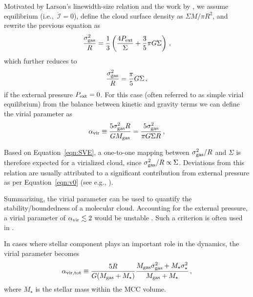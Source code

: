 \IfFileExists{emulateapjlegacy.cls}{\documentclass[iop]{emulateapjlegacy}}{\documentclass[iop]{emulateapj}}
\begin{document}
Motivated by Larson's linewidth-size relation \citep{Larson81a} and the work by \citet{Heyer09a}, we assume equilibrium (i.e.,\ ${\ddot{\mathcal{I}}}=0$), define the cloud surface density as
$\Sigma$\eq$M/\pi R^2$, and rewrite the previous equation as
\begin{equation}
\frac{\sigma_{\rm gas}^2}{R} = \frac{1}{3}\left(\frac{4P_{\rm ext}}{\Sigma} + \frac{3}{5} \pi G \Sigma \right)\,,
\label{eqn:v0}
\end{equation}
which further reduces to
\begin{equation}
\frac{\sigma_{\rm gas}^2}{R} = \frac{\pi}{5} G \Sigma\,,
\label{eqn:SVE}
\end{equation}
if the external pressure $P_{\rm ext}=0$. For this case (often referred to as simple virial equilibrium) from the balance between kinetic and gravity terms we can define the virial parameter as
\begin{equation}
\alpha_{\rm vir} \equiv  \frac{5\sigma_{\rm gas}^2R}{GM_{\rm gas}} = \frac{5\sigma_{\rm gas}^2}{\pi G \Sigma R}\,,
\label{eqn:alpha}
\end{equation}

Based on Equation~\ref{eqn:SVE}, a one-to-one mapping between $\sigma_{\rm gas}^2/R$ and $\Sigma$ is therefore expected for a virialized cloud, since $\sigma_{\rm gas}^2/R\propto\Sigma$. Deviations from this relation are usually attributed to a significant contribution from external pressure as per Equation~\ref{eqn:v0} (see e.g., \citealt{Heyer09a, Hughes10a, Hughes13b, Meidt13a}).

Summarizing, the virial parameter can be used to quantify the stability/boundedness of
    a molecular cloud.
Accounting for the external pressure, a virial parameter of $\alpha_{\rm vir}\lesssim2$ would be unstable \citep{Bertoldi92b}.
%
Such a criterion is often used in \obs \citep[see e.g., ][]{Kauffmann17b}.

In cases where stellar component plays an important role in the dynamics, the virial parameter becomes
\begin{equation}
\alpha_{\rm vir, tot} \equiv \frac{5 R}{G (M_{\rm gas} + M_{\star})} \frac{M_{\rm gas} \sigma_{\rm gas}^2 + M_{\star} \sigma_\star^2}
					       {M_{\rm gas} + M_{\star} }\,,
\label{eqn:alpha_tot}
\end{equation}
where $M_\star$ is the stellar mass within the MCC volume.


\end{document}
